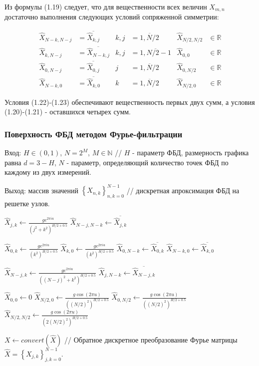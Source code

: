 Из формулы (1.19) следует, что для вещественности всех величин $X_{m,n}$ достаточно выполнения следующих условий сопряженной симметрии:

\begin{align}
		\hat{X}_{N-k,N-j} &= \overline{\hat{X}_{k,j}} &k,j &= \overline{1,N/2} &\hat{X}_{N/2,N/2} & \in \mathbb{R}\\
		\hat{X}_{k,N-j} &= \overline{\hat{X}_{N-k,j}} &k,j &= \overline{1,N/2-1} &\hat{X}_{0,0} & \in \mathbb{R}\\
		\hat{X}_{0,N-j} &= \overline{\hat{X}_{0,j}} &j &= \overline{1,N/2} &\hat{X}_{0,N/2} & \in \mathbb{R}\\
		\hat{X}_{N-k,0} &= \overline{\hat{X}_{k,0}} &k &= \overline{1,N/2} &\hat{X}_{N/2,0} & \in \mathbb{R}
\end{align}

Условия (1.22)-(1.23) обеспечивают вещественность первых двух сумм, а условия (1.20)-(1.21) - оставшихся четырех сумм.

\subsubsection{Поверхность ФБД методом Фурье-фильтрации}

Вход: $H \in (0,1)$, $N=2^M$, $M \in \mathbb{N}$ // $H$ - параметр ФБД, размерность графика равна $d = 3 - H$, $N$ - параметр, определяющий количество точек ФБД по каждому из двух измерений.

Выход: массив значений $\left\{X_{n,k}\right\}_{n,k=0}^{N-1}$ // дискретная апроксимация ФБД на решетке узлов.

\begin{algorithmic}[1]
	\State $\hat{X}_{j,k} \gets \frac{ge^{2\pi iu}}{(j^2+k^2)^{H/2+0.5}}$
	\State$\hat{X}_{N-j,N-k} \gets \overline{\hat{X}_{j,k}}$
	\EndFor
	
	\State $\hat{X}_{0,k} \gets \frac{ge^{2\pi iu}}{(k^2)^{H/2+0.5}}$
	\State $\hat{X}_{k,0} \gets \frac{ge^{2\pi iu}}{(k^2)^{H/2+0.5}}$
	\State $\hat{X}_{0,N-k} \gets \overline{\hat{X}_{0,k}}$
	\State $\hat{X}_{N-k,0} \gets \overline{\hat{X}_{k,0}}$
	\EndFor
	
	\State $\hat{X}_{N-j,k} \gets \frac{ge^{2\pi iu}}{((N-j)^2+k^2)^{H/2+0.5}}$
	\State $\hat{X}_{j,N-k} \gets \overline{\hat{X}_{N-j,k}}$
	\EndFor
	
	\State $\hat{X}_{0,0} \gets 0$
	\State $\hat{X}_{N/2,0} \gets \frac{g\cos (2\pi u)}{((N/2)^2)^{H/2+0.5}}$
	\State $\hat{X}_{0,N/2} \gets \frac{g\cos (2\pi u)}{((N/2)^2)^{H/2+0.5}}$
	\State $\hat{X}_{N/2,N/2} \gets \frac{g\cos (2\pi u)}{(2(N/2)^2)^{H/2+0.5}}$
	
	\State $X \gets convert(\hat{X})$ // Обратное дискретное преобразование Фурье матрицы $\hat{X} = \left\{X_{j,k}\right\}_{j,k=0}^{N-1}$.
\end{algorithmic}


